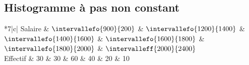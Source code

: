\documentclass[10pt,openright,twoside,french]{book}
\begin{document}
\subsection{Histogramme à pas non constant}

\begin{center}
\renewcommand\arraystretch{2}
\begin{tabular}{*{7}{|c}|}
\hline
    Salaire & $\intervallefo{900}{200}$ & $\intervallefo{1200}{1400}$ & $\intervallefo{1400}{1600}$ & $\intervallefo{1600}{1800}$ & $\intervallefo{1800}{2000}$ & $\intervalleff{2000}{2400}$ \\
\hline
    Effectif & 30 & 30 & 60 & 40 & 20 & 10 \\
\hline
\end{tabular}
\renewcommand\arraystretch{1}
\end{center}
\end{document}
